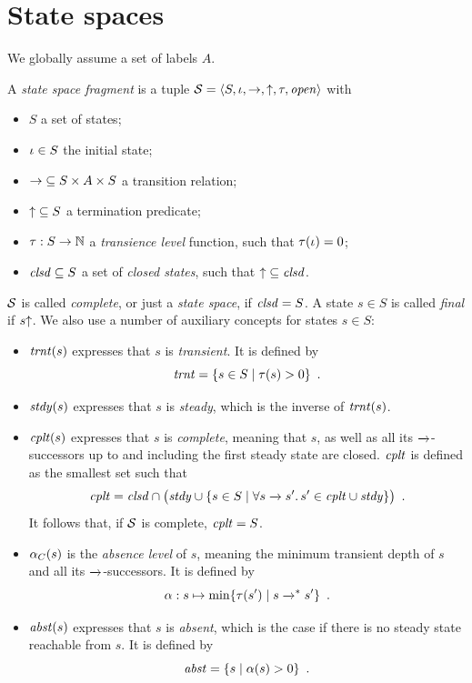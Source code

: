 \documentclass{article}
\begin{document}
\section*{State spaces}

\medskip\noindent
We globally assume a set of labels $A$.

\medskip\noindent 
A \emph{state space fragment} is a tuple $\mathcal{S}=\langle{S,\ensuremath{\iota},{\rightarrow},{{\uparrow}},\ensuremath{\tau},\ensuremath{\mathit{open}}}\rangle$ with
\begin{itemize}
\item $S$ a set of states;
\item $\iota\in S$ the initial state;
\item ${\rightarrow}\subseteq S\times A\times S$ a transition relation;
\item ${{\uparrow}}\subseteq S$ a termination predicate;
\item ${\tau}:S\to \mathbb{N}$ a \emph{transience level} function, such that $\tau(\iota)=0$;
\item $\mathit{clsd}\subseteq S$ a set of \emph{closed states}, such that ${\uparrow}\subseteq \mathit{clsd}$.
\end{itemize}
%
$\mathcal{S}$ is called \emph{complete}, or just a \emph{state space}, if $\mathit{clsd}=S$. A state $s\in S$ is called \emph{final} if $s{\uparrow}$. We also use a number of auxiliary concepts for states $s\in S$:

\begin{itemize}
\item $\mathit{trnt}(s)$ expresses that $s$ is \emph{transient}. It is defined by
%
\[ \Transient = \gensetof{s\in S}{\TLevel(s)>0} \enspace. \]

\item $\mathit{stdy}(s)$ expresses that $s$ is \emph{steady}, which is the inverse of $\mathit{trnt}(s)$.

\item $\mathit{cplt}(s)$ expresses that $s$ is \emph{complete}, meaning that $s$, as well as all its $\trans{}$-successors up to and including the first steady state are closed. $\mathit{cplt}$ is defined as the smallest set such that
%
\[ \Complete = \Closed\cap \bigl(\Steady \cup \gensetof{s\in S}{\forall s\trans{} s'.\, s'\in \Complete\cup \Steady}\bigr) \enspace.
\]
It follows that, if $\mathcal{S}$ is complete, $\mathit{cplt}=S$.

\item $\alpha_C(s)$ is the \emph{absence level} of $s$, meaning the minimum transient depth of $s$ and all its $\trans{}$-successors. It is defined by
%
\[ \ALevel: s\mapsto \min\gensetof{\TLevel(s')}{s\trans{}^* s'} \enspace. \]

\item $\mathit{abst}(s)$ expresses that $s$ is \emph{absent}, which is the case if there is no steady state reachable from $s$. It is defined by
%
\[ \Absent= \gensetof{s}{\ALevel(s)>0} \enspace. \]
\end{itemize}
\end{document}
